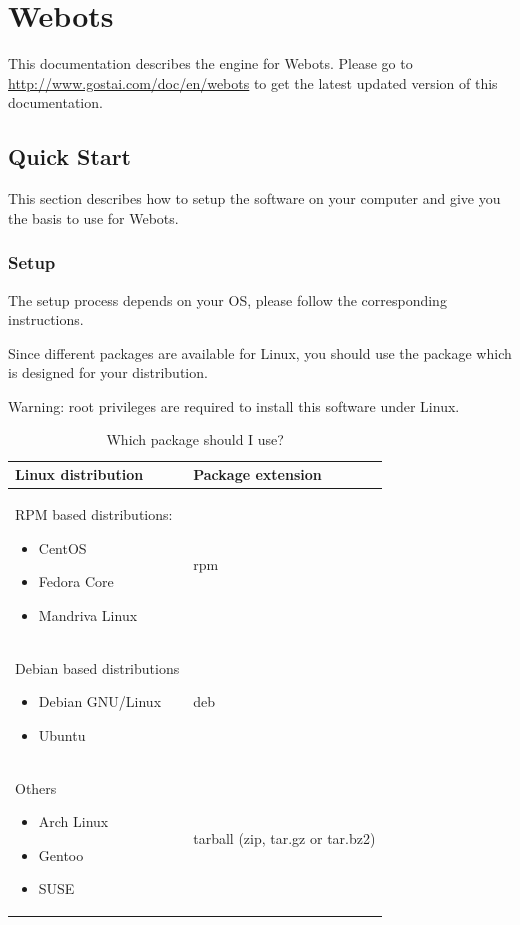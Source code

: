 \chapter{Webots}
\label{sec:webots}

This documentation describes the \urbi engine for Webots.  Please go to
\url{http://www.gostai.com/doc/en/webots} to get the latest updated
version of this documentation.

\section{Quick Start}

This section describes how to setup the software on your computer and
give you the basis to use \urbi for Webots.


\subsection{Setup}

The setup process depends on your OS, please follow the corresponding
instructions.

Since different packages are available for Linux, you should use the
package which is designed for your distribution.

Warning: root privileges are required to install this software under
Linux.

\begin{table}[htbp]
  \begin{center}
    \begin{tabular}{p{.4\linewidth}l}
      \hline
      Linux distribution &    Package extension\\
      \hline
      RPM based distributions:
      \begin{itemize}
      \item CentOS
      \item Fedora Core
      \item Mandriva Linux
      \end{itemize}
      &
      rpm\\
      Debian based distributions
      \begin{itemize}
      \item Debian GNU/Linux
      \item Ubuntu
      \end{itemize}
      &
      deb \\
      Others
      \begin{itemize}
      \item Arch Linux
      \item Gentoo
      \item SUSE
      \end{itemize}
      &
      tarball (zip, tar.gz or tar.bz2)\\
      \hline
    \end{tabular}
  \end{center}
  \caption{Which package should I use?}
  \end{table}

